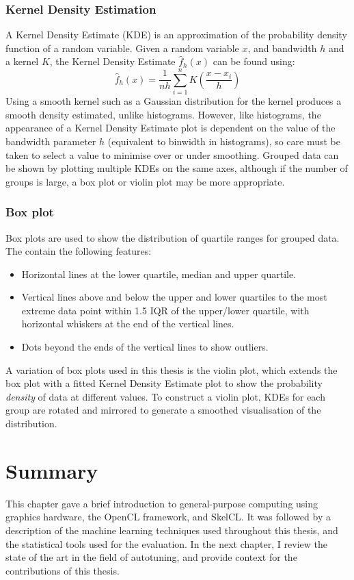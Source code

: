 \subsubsection{Kernel Density Estimation}

A Kernel Density Estimate (KDE) is an approximation of the probability
density function of a random variable. Given a random variable $x$,
and bandwidth $h$ and a kernel $K$, the Kernel Density Estimate
$\hat{f}_h(x)$ can be found using:
%
\begin{equation}
  \hat{f}_h(x) = \frac{1}{nh} \sum^{n}_{i=1} K\left( \frac{x - x_i}{h} \right)
\end{equation}
%
Using a smooth kernel such as a Gaussian distribution for the kernel
produces a smooth density estimated, unlike histograms. However, like
histograms, the appearance of a Kernel Density Estimate plot is
dependent on the value of the bandwidth parameter $h$ (equivalent to
binwidth in histograms), so care must be taken to select a value to
minimise over or under smoothing. Grouped data can be shown by
plotting multiple KDEs on the same axes, although if the number of
groups is large, a box plot or violin plot may be more appropriate.


\subsubsection{Box plot}

Box plots are used to show the distribution of quartile ranges for
grouped data. The contain the following features:
%
\begin{itemize}
\item Horizontal lines at the lower quartile, median and upper
  quartile.
\item Vertical lines above and below the upper and lower quartiles to
  the most extreme data point within 1.5 IQR of the upper/lower
  quartile, with horizontal whiskers at the end of the vertical lines.
\item Dots beyond the ends of the vertical lines to show outliers.
\end{itemize}
%
A variation of box plots used in this thesis is the violin plot, which
extends the box plot with a fitted Kernel Density Estimate plot to
show the probability \emph{density} of data at different values. To
construct a violin plot, KDEs for each group are rotated and mirrored
to generate a smoothed visualisation of the distribution.


\section{Summary}

This chapter gave a brief introduction to general-purpose computing
using graphics hardware, the OpenCL framework, and SkelCL. It was
followed by a description of the machine learning techniques used
throughout this thesis, and the statistical tools used for the
evaluation. In the next chapter, I review the state of the art in the
field of autotuning, and provide context for the contributions of this
thesis.
